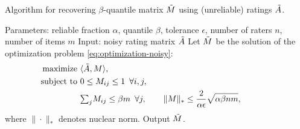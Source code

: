 \begin{algorithm}[b!]
\caption{Algorithm for recovering $\beta$-quantile matrix $\tilde{M}$ using
(unreliable) ratings $\tilde{A}$.}
\label{alg:recover-M}
\begin{algorithmic}[1]
\State Parameters: reliable fraction $\alpha$, quantile $\beta$, tolerance $\epsilon$, number of raters $n$, number of items $m$
\State Input: noisy rating matrix $\tilde{A}$
\State Let $\tilde{M}$ be the solution of the optimization problem \eqref{eq:optimization-noisy}:
  \begin{align}
  \label{eq:optimization-noisy}
  \text{maximize } &\langle \tilde{A}, M \rangle, \\
  \notag \text{ subject to } &0 \leq M_{ij} \leq 1 \,\,\, \forall i,j, \\
  \notag                     &{\textstyle \sum_{j}} M_{ij} \leq \beta m \,\,\, \forall j, \quad\quad
                      \|M\|_* \leq \frac{2}{\alpha\epsilon}\sqrt{\alpha\beta nm}, \phantom{xxxxxxx}
  \end{align}
  where $\|\cdot\|_*$ denotes nuclear norm.
\State Output $\tilde{M}$.
\end{algorithmic}
\end{algorithm}
